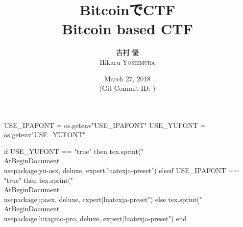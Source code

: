 \hypersetup{colorlinks,linkcolor=,urlcolor=links}

\beamertemplatenavigationsymbolsempty


\usepackage{luacode}
\usepackage{luatexja}
\usepackage{pgfpages}
\usepackage{fontspec}

\begin{luacode*}
  USE_IPAFONT = os.getenv"USE_IPAFONT"
  USE_YUFONT = os.getenv"USE_YUFONT"
  
  if USE_YUFONT == "true" then
    tex.sprint("\\AtBeginDocument{\\usepackage[yu-osx, deluxe, expert]{luatexja-preset}}")
  elseif USE_IPAFONT == "true" then
    tex.sprint("\\AtBeginDocument{\\usepackage[ipaex, deluxe, expert]{luatexja-preset}}")
  else
    tex.sprint("\\AtBeginDocument{\\usepackage[hiragino-pro, deluxe, expert]{luatexja-preset}}")
  end
\end{luacode*}


\usepackage{epigraph}
\usepackage{etoolbox}
\usepackage{tikz}
\usepackage{framed}
\usepackage[ss]{libertine}
\usepackage[libertine]{newtxmath}
\usepackage{amsmath}
\usepackage{mathtools}
\usepackage{listings}
\usepackage{caption}

\renewcommand{\kanjifamilydefault}{\gtdefault}



\setmonofont[Ligatures=TeX]{CMU Typewriter Text}



\title[BitcoinでCTF]{%
  BitcoinでCTF \\
  {\normalsize Bitcoin based CTF} 
}
\author[吉村 優]{%
  吉村 優 \\
  Hikaru \textsc{Yoshimura}
}
\date[March 27, 2018]{%
  March 27, 2018 \\%
  {\footnotesize (Git Commit ID: \href{https://github.com/y-yu/bitcoin-ctf-slide}{\GITAbrHash})}
}

